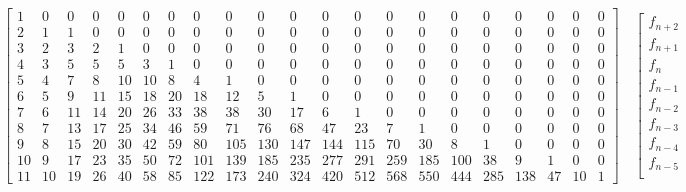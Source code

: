 \begin{sidewaystable}
    \begin{displaymath}
        \left[
            \begin{array}{ccccccccccccccccccccc}
                1 & 0 & 0 & 0 & 0 & 0 & 0 & 0 & 0 & 0 & 0 & 0 & 0 & 0 & 0 & 0 & 0 & 0 & 0 & 0 & 0\\
                2 & 1 & 1 & 0 & 0 & 0 & 0 & 0 & 0 & 0 & 0 & 0 & 0 & 0 & 0 & 0 & 0 & 0 & 0 & 0 & 0\\
                3 & 2 & 3 & 2 & 1 & 0 & 0 & 0 & 0 & 0 & 0 & 0 & 0 & 0 & 0 & 0 & 0 & 0 & 0 & 0 & 0\\
                4 & 3 & 5 & 5 & 5 & 3 & 1 & 0 & 0 & 0 & 0 & 0 & 0 & 0 & 0 & 0 & 0 & 0 & 0 & 0 & 0\\
                5 & 4 & 7 & 8 & 10 & 10 & 8 & 4 & 1 & 0 & 0 & 0 & 0 & 0 & 0 & 0 & 0 & 0 & 0 & 0 & 0\\
                6 & 5 & 9 & 11 & 15 & 18 & 20 & 18 & 12 & 5 & 1 & 0 & 0 & 0 & 0 & 0 & 0 & 0 & 0 & 0 & 0\\
                7 & 6 & 11 & 14 & 20 & 26 & 33 & 38 & 38 & 30 & 17 & 6 & 1 & 0 & 0 & 0 & 0 & 0 & 0 & 0 & 0\\
                8 & 7 & 13 & 17 & 25 & 34 & 46 & 59 & 71 & 76 & 68 & 47 & 23 & 7 & 1 & 0 & 0 & 0 & 0 & 0 & 0\\
                9 & 8 & 15 & 20 & 30 & 42 & 59 & 80 & 105 & 130 & 147 & 144 & 115 & 70 & 30 & 8 & 1 & 0 & 0 & 0 & 0\\
                10 & 9 & 17 & 23 & 35 & 50 & 72 & 101 & 139 & 185 & 235 & 277 & 291 & 259 & 185 & 100 & 38 & 9 & 1 & 0 & 0\\
                11 & 10 & 19 & 26 & 40 & 58 & 85 & 122 & 173 & 240 & 324 & 420 & 512 & 568 & 550 & 444 & 285 & 138 & 47 & 10 & 1
            \end{array}
            \right]  \quad %
            \left[
                \begin{array}{c}
                    f_{n + 2}\\
                    f_{n + 1}\\
                    f_{n}\\
                    f_{n - 1}\\
                    f_{n - 2}\\
                    f_{n - 3}\\
                    f_{n - 4}\\
                    f_{n - 5}\\

\end{array}
\end{displaymath}
\end{sidewaystable}

